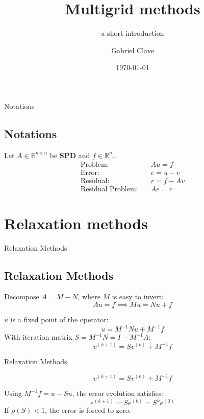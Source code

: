 \documentclass{beamer}
\title{Multigrid methods}
\subtitle{a short introduction}
\author{Gabriel Clave}
\date{\today}
\begin{document}
\frame{\titlepage}

\begin{frame}{Notations}
\subsection*{Notations}
Let $A \in \mathbb{R}^{n \times n}$ be \textbf{SPD} and $f \in \mathbb{R}^n$.
\begin{align*}
    \text{Problem:}          \quad & Au = f \\
    \text{Error:}            \quad & e = u - v \\
    \text{Residual:}         \quad & r = f - Av \\
    \text{Residual Problem:} \quad & Ae = r
\end{align*}
\end{frame}

\section{Relaxation methods}

\begin{frame}{Relaxation Methods}
\subsection*{Relaxation Methods}
Decompose $A = M - N$, where $M$ is easy to invert:
\[
    Au = f \implies Mu = Nu + f
\]

$u$ is a fixed point of the operator:
\[
    u = M^{-1}Nu + M^{-1}f
\]
With iteration matrix $S = M^{-1}N = I - M^{-1}A$:
\[
    v^{(k+1)} = Sv^{(k)} + M^{-1}f
\]
\end{frame}

\begin{frame}{Relaxation Methods}

\[
    v^{(k+1)} = Sv^{(k)} + M^{-1}f
\]

Using $M^{-1}f = u - Su$, the error evolution satisfies:
\[
    e^{(k+1)} = Se^{(k)} = S^{k}e^{(0)}
\]
If $\rho(S) < 1$, the error is forced to zero.
\end{frame}
\end{document}
